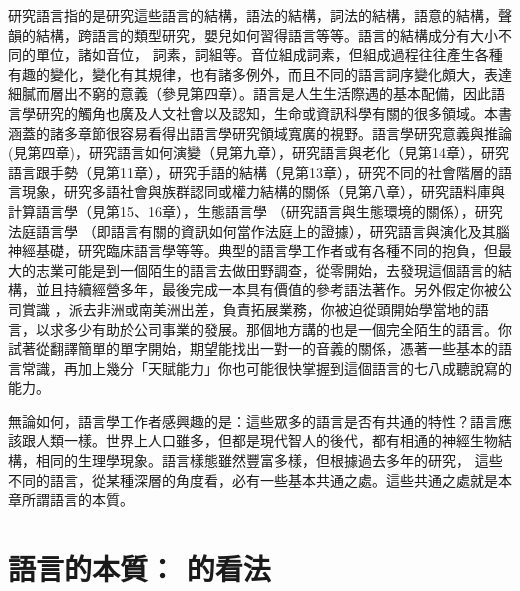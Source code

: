 研究語言指的是研究這些語言的結構，語法的結構，詞法的結構，語意的結構，聲韻的結構，跨語言的類型研究，嬰兒如何習得語言等等。語言的結構成分有大小不同的單位，諸如音位， 詞素，詞組等。音位組成詞素，但組成過程往往產生各種有趣的變化，變化有其規律，也有諸多例外，而且不同的語言詞序變化頗大，表達細膩而層出不窮的意義（參見第四章）。語言是人生生活際遇的基本配備，因此語言學研究的觸角也廣及人文社會以及認知，生命或資訊科學有關的很多領域。本書涵蓋的諸多章節很容易看得出語言學研究領域寬廣的視野。語言學研究意義與推論 (見第四章)，研究語言如何演變（見第九章），研究語言與老化（見第14章），研究語言跟手勢（見第11章），研究手語的結構（見第13章），研究不同的社會階層的語言現象，研究多語社會與族群認同或權力結構的關係（見第八章），研究語料庫與計算語言學（見第15、16章），生態語言學 （研究語言與生態環境的關係），研究法庭語言學 （即語言有關的資訊如何當作法庭上的證據），研究語言與演化及其腦神經基礎，研究臨床語言學等等。典型的語言學工作者或有各種不同的抱負，但最大的志業可能是到一個陌生的語言去做田野調查，從零開始，去發現這個語言的結構，並且持續經營多年，最後完成一本具有價值的參考語法著作。另外假定你被公司賞識 ，派去非洲或南美洲出差，負責拓展業務，你被迫從頭開始學當地的語言，以求多少有助於公司事業的發展。那個地方講的也是一個完全陌生的語言。你試著從翻譯簡單的單字開始，期望能找出一對一的音義的關係，憑著一些基本的語言常識，再加上幾分「天賦能力」你也可能很快掌握到這個語言的七八成聽說寫的能力。

無論如何，語言學工作者感興趣的是：這些眾多的語言是否有共通的特性？語言應該跟人類一樣。世界上人口雖多，但都是現代智人的後代，都有相通的神經生物結構，相同的生理學現象。語言樣態雖然豐富多樣，但根據過去多年的研究， 這些不同的語言，從某種深層的角度看，必有一些基本共通之處。這些共通之處就是本章所謂語言的本質。

\section{語言的本質：\citet{Hockett1960} 的看法}  %

